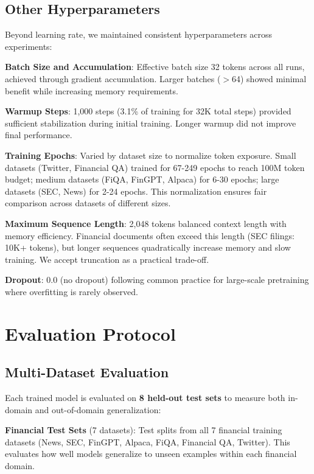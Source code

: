 \subsection{Other Hyperparameters}

Beyond learning rate, we maintained consistent hyperparameters across experiments:

\textbf{Batch Size and Accumulation}: Effective batch size 32 tokens across all runs, achieved through gradient accumulation. Larger batches ($>$64) showed minimal benefit while increasing memory requirements.

\textbf{Warmup Steps}: 1,000 steps (3.1\% of training for 32K total steps) provided sufficient stabilization during initial training. Longer warmup did not improve final performance.

\textbf{Training Epochs}: Varied by dataset size to normalize token exposure. Small datasets (Twitter, Financial QA) trained for 67-249 epochs to reach 100M token budget; medium datasets (FiQA, FinGPT, Alpaca) for 6-30 epochs; large datasets (SEC, News) for 2-24 epochs. This normalization ensures fair comparison across datasets of different sizes.

\textbf{Maximum Sequence Length}: 2,048 tokens balanced context length with memory efficiency. Financial documents often exceed this length (SEC filings: 10K+ tokens), but longer sequences quadratically increase memory and slow training. We accept truncation as a practical trade-off.

\textbf{Dropout}: 0.0 (no dropout) following common practice for large-scale pretraining where overfitting is rarely observed.

\section{Evaluation Protocol}

\subsection{Multi-Dataset Evaluation}

Each trained model is evaluated on \textbf{8 held-out test sets} to measure both in-domain and out-of-domain generalization:

\textbf{Financial Test Sets} (7 datasets): Test splits from all 7 financial training datasets (News, SEC, FinGPT, Alpaca, FiQA, Financial QA, Twitter). This evaluates how well models generalize to unseen examples within each financial domain.

